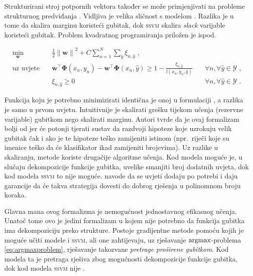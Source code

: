 Strukturirani stroj potpornih vektora  također se može primjenjivati na probleme strukturnog predviđanja
\citep{tsochantaridis2005large}. Vidljiva je velika sličnost s modelom \mmmm{}.
Razlika je u tome da \mmmm{} skalira marginu koristeći gubitak, dok
\textsc{ssvm} skalira \textit{slack} varijable koristeći gubitak. Problem
kvadratnog programiranja priložen je ispod.

\begin{equation}\label{eq:ssvm}
\begin{aligned}
  \min_{\mathbf{w}} & \quad \frac{1}{2} {\lVert\mathbf{w}\lVert}^2 + C \sum_{n=1}^{N}\sum_{\hat{y}} \xi_{n,\hat{y}} \text{ ,}              & \\
  \text{uz uvjete}  & \quad \mathbf{w}^\top \mathbf{\Phi}(x_n, y_n) - \mathbf{w}^\top \mathbf{\Phi}(x_n, \hat{y}) \ge 1 - \frac{\xi_{n,\hat{y}}}{l(x_n, y_n, \hat{y})} & \quad \forall n, \forall \hat{y} \in \mathcal{Y} \text{ ,}\\
                    & \quad \xi_{n,\hat{y}} \ge 0                                                                                          & \quad \forall n, \forall \hat{y} \in \mathcal{Y} \text{ .}
\end{aligned}
\end{equation}

\noindent
Funkcija koju je potrebno minimizirati identična je onoj u formulaciji \mmmm{}, a
razlika je samo u prvom uvjetu. Intuitivnije je skalirati grešku tijekom učenja
(rezervne  varijable) gubitkom nego skalirati marginu. Autori tvrde da je
ovaj formalizam bolji od \mmmm{} jer će potonji tjerati sustav da razdvoji
hipoteze koje uzrokuju velik gubitak čak i ako je te hipoteze teško zamijeniti
istinom (npr.~riječi koje su imenice teško da će klasifikator ikad zamijeniti
brojevima). Uz razlike u skaliranju, metode koriste drugačije algoritme učenja.
Kod modela \mmmm{} moguće je, u slučaju dekompozicije funkcije gubitka, uvelike
smanjiti broj dodatnih uvjeta, dok kod modela \textsc{ssvm} to nije moguće.
\citet{tsochantaridis2005large} navode da se uvjeti dodaju po potrebi i daju
garancije da će takva strategija dovesti do dobrog rješenja u polinomnom broju
koraka.

Glavna mana ovog formalizma je nemogućnost jednostavnog efikasnog učenja. Unatoč
tome ovo je jedini formalizam u kojem nije potrebno da funkcija gubitka ima
dekompoziciju preko strukture. Postoje gradijentne metode pomoću kojih je moguće
učiti modele \mmmm{} i \textsc{ssvm}, ali one zahtijevaju, uz rješavanje
$\operatorname*{argmax}$-problema \ref{eq:argmaxproblem}, rješavanje takozvane \textit{pretrage
proširene gubitkom}. Kod modela \mmmm{} ta je pretraga rješiva zbog mogućnosti
dekompozicije funkcije gubitka, dok kod modela \textsc{ssvm} nije
\citep{ratliff2006maximum}.
